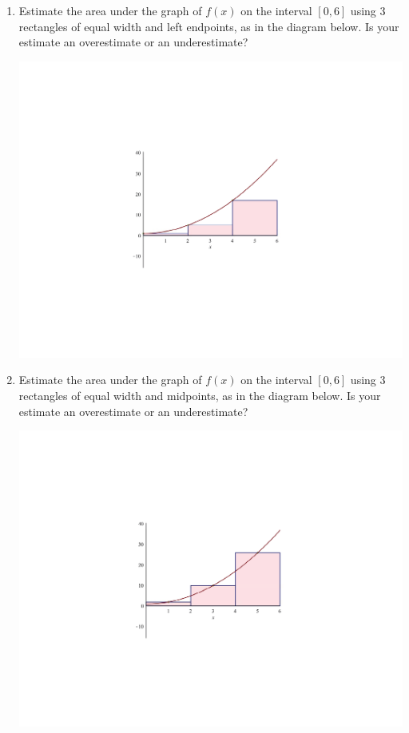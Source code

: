\documentclass[12pt]{article}
\newif\ifans
\begin{document}
\begin{enumerate}
\begin{enumerate}
\ifans{\fbox{$A \approx 118$; It is an overestimate.}} \fi

\item Estimate the area under the graph of $f(x)$ on the interval $[0,6]$ using 3 rectangles of equal width and left endpoints, as in the diagram below.  Is your estimate an overestimate or an underestimate?

\begin{center}

\includegraphics[scale=0.45]{x2+1left.pdf}

\end{center}

\ifans{\fbox{$A \approx 46$; It is an underestimate.}} \fi

\item Estimate the area under the graph of $f(x)$ on the interval $[0,6]$ using 3 rectangles of equal width and midpoints, as in the diagram below.  Is your estimate an overestimate or an underestimate?

\begin{center}

\includegraphics[scale=0.45]{x2+1mid.pdf}


\end{center}
\end{enumerate}
\end{enumerate}
\end{document}
